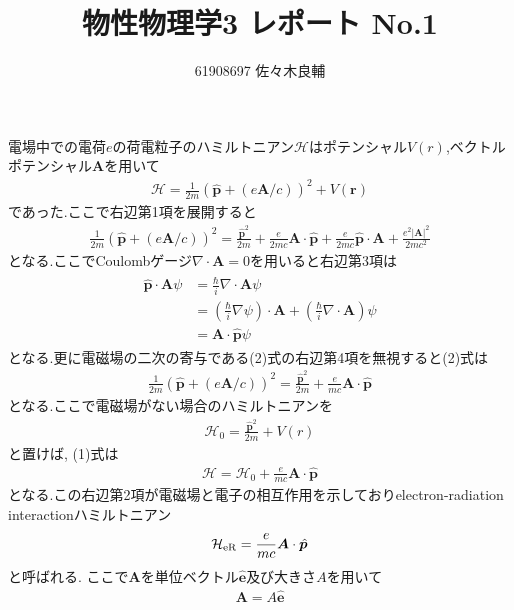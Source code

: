 \documentclass[uplatex,a4j,11pt,dvipdfmx]{jsarticle}
\begin{document}
\title{物性物理学3 レポート No.1}
\author{61908697 佐々木良輔}
\date{}
\maketitle
電場中での電荷$e$の荷電粒子のハミルトニアン$\mathcal{H}$はポテンシャル$V(r)$,ベクトルポテンシャル$\bm A$を用いて
\begin{align}
  \mathcal{H}=\frac{1}{2m}\left(\hat{{\bm p}}+(e{\bm A}/c)\right)^2+V({\bm r})
\end{align}
であった.ここで右辺第1項を展開すると
\begin{align}
  \frac{1}{2m}\left(\hat{{\bm p}}+(e{\bm A}/c)\right)^2=\frac{\hat{\bm p}^2}{2m}
  +\frac{e}{2mc}{\bm A}\cdot\hat{\bm p}
  +\frac{e}{2mc}\hat{\bm p}\cdot{\bm A}
  +\frac{e^2|{\bm A}|^2}{2mc^2}
\end{align}
となる.ここでCoulombゲージ$\nabla\cdot{\bm A}=0$を用いると右辺第3項は
\begin{align}
  \begin{split}
    \hat{\bm p}\cdot{\bm A}\psi&=\frac{\hbar}{i}\nabla\cdot{\bm A}\psi\\
    &=\left(\frac{\hbar}{i}\nabla\psi\right)\cdot{\bm A}+\left(\frac{\hbar}{i}\nabla\cdot{\bm A}\right)\psi\\
    &={\bm A}\cdot\hat{\bm p}\psi
  \end{split}
\end{align}
となる.更に電磁場の二次の寄与である(2)式の右辺第4項を無視すると(2)式は
\begin{align}
  \frac{1}{2m}\left(\hat{{\bm p}}+(e{\bm A}/c)\right)^2=\frac{\hat{\bm p}^2}{2m}+\frac{e}{mc}{\bm A}\cdot\hat{\bm p}
\end{align}
となる.ここで電磁場がない場合のハミルトニアンを
\begin{align}
  \mathcal{H}_0=\frac{\hat{\bm p}^2}{2m}+V(r)
\end{align}
と置けば, (1)式は
\begin{align}
  \mathcal{H}=\mathcal{H}_0+\frac{e}{mc}{\bm A}\cdot\hat{\bm p}
\end{align}
となる.この右辺第2項が電磁場と電子の相互作用を示しておりelectron-radiation interactionハミルトニアン
\begin{align}
  \mathcal{H}_{\rm eR}=\frac{e}{mc}{\bm A}\cdot\hat{\bm p}
\end{align}
と呼ばれる.
ここで$\bm A$を単位ベクトル$\hat{\bm e}$及び大きさ$A$を用いて
\begin{align}
  {\bm A}=A\hat{\bm e}
\end{align}
\end{document}
